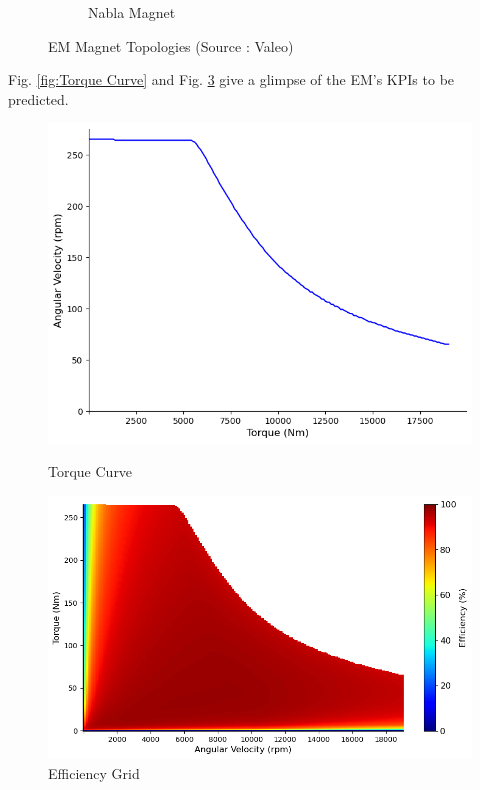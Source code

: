 \documentclass{report} %
\begin{document}
\begin{figure}[H]
\begin{subfigure}{0.32\textwidth}
        \caption{Nabla Magnet}
        \label{fig:Nabla Magnet}
    \end{subfigure}
    \caption{\ac{EM} Magnet Topologies (Source : Valeo)}
    \label{fig:EM Magnet Topologies}
\end{figure}

Fig. \ref{fig:Torque Curve} and Fig. \ref{fig:Efficiency Grid} give a glimpse of the \ac{EM}'s \ac{KPI}s to be predicted.
\begin{figure}[H]
    \centering
    \begin{minipage}[b]{0.44\textwidth}
        \centering
        \includegraphics[width=\textwidth]{./ReportImages/TorqueCurve.png}
        \caption{Torque Curve}
        \label{fig:Torque Curve}
    \end{minipage}
    \hfill
    \begin{minipage}[b]{0.54\textwidth}
        \centering
        \includegraphics[width=\textwidth]{./ReportImages/EfficiencyGrid.png}
        \caption{Efficiency Grid}
        \label{fig:Efficiency Grid}
    \end{minipage}
\end{figure}
\end{document}
